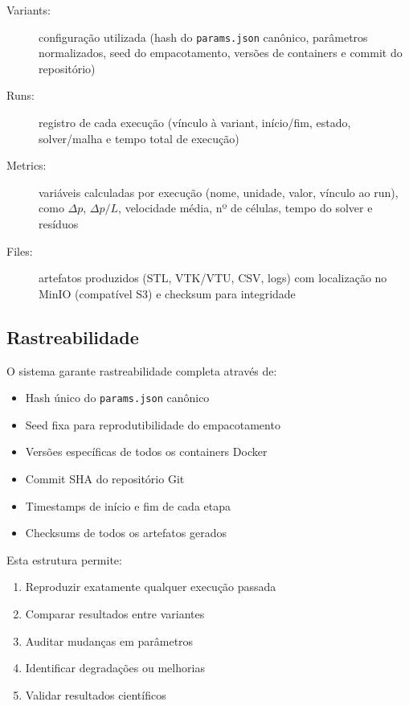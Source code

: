 \begin{description}
    \item[Variants:] configuração utilizada (hash do \texttt{params.json} canônico, parâmetros normalizados, seed do empacotamento, versões de containers e commit do repositório)
    
    \item[Runs:] registro de cada execução (vínculo à variant, início/fim, estado, solver/malha e tempo total de execução)
    
    \item[Metrics:] variáveis calculadas por execução (nome, unidade, valor, vínculo ao run), como $\Delta p$, $\Delta p/L$, velocidade média, nº de células, tempo do solver e resíduos
    
    \item[Files:] artefatos produzidos (STL, VTK/VTU, CSV, logs) com localização no MinIO (compatível S3) e checksum para integridade
\end{description}

\subsection{Rastreabilidade}

O sistema garante rastreabilidade completa através de:
\begin{itemize}
    \item Hash único do \texttt{params.json} canônico
    \item Seed fixa para reprodutibilidade do empacotamento
    \item Versões específicas de todos os containers Docker
    \item Commit SHA do repositório Git
    \item Timestamps de início e fim de cada etapa
    \item Checksums de todos os artefatos gerados
\end{itemize}

Esta estrutura permite:
\begin{enumerate}
    \item Reproduzir exatamente qualquer execução passada
    \item Comparar resultados entre variantes
    \item Auditar mudanças em parâmetros
    \item Identificar degradações ou melhorias
    \item Validar resultados científicos
\end{enumerate}

